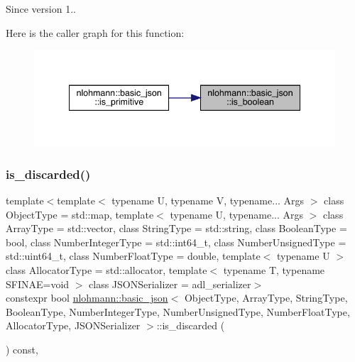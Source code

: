 \begin{DoxySince}{Since}
version 1.. 
\end{DoxySince}
Here is the caller graph for this function\+:\nopagebreak
\begin{figure}[H]
\begin{center}
\leavevmode
\includegraphics[width=341pt]{classnlohmann_1_1basic__json_a943e8cb182d0f2365c76d64b42eaa6fd_icgraph}
\end{center}
\end{figure}
\mbox{\label{classnlohmann_1_1basic__json_aabe623bc8304c2ba92d96d91f390fab4}} 
\subsubsection{\texorpdfstring{is\_discarded()}{is\_discarded()}}
{\footnotesize\ttfamily template$<$template$<$ typename U, typename V, typename... Args $>$ class Object\+Type = std\+::map, template$<$ typename U, typename... Args $>$ class Array\+Type = std\+::vector, class String\+Type  = std\+::string, class Boolean\+Type  = bool, class Number\+Integer\+Type  = std\+::int64\+\_\+t, class Number\+Unsigned\+Type  = std\+::uint64\+\_\+t, class Number\+Float\+Type  = double, template$<$ typename U $>$ class Allocator\+Type = std\+::allocator, template$<$ typename T, typename S\+F\+I\+N\+A\+E=void $>$ class J\+S\+O\+N\+Serializer = adl\+\_\+serializer$>$ \\
constexpr bool \mbox{\hyperlink{classnlohmann_1_1basic__json}{nlohmann\+::basic\+\_\+json}}$<$ Object\+Type, Array\+Type, String\+Type, Boolean\+Type, Number\+Integer\+Type, Number\+Unsigned\+Type, Number\+Float\+Type, Allocator\+Type, J\+S\+O\+N\+Serializer $>$\+::is\+\_\+discarded (\begin{DoxyParamCaption}{ }\end{DoxyParamCaption}) const\hspace{0.3cm}{\ttfamily [inline]}, {\ttfamily [noexcept]}}



